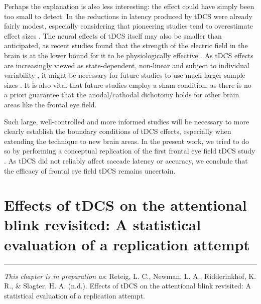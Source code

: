 \documentclass[11pt,english,]{memoir}
\begin{document}
Perhaps the explanation is also less interesting: the effect could have simply been too small to detect. In \textcite{Kanai2012} the reductions in latency produced by tDCS were already fairly modest, especially considering that pioneering studies tend to overestimate effect sizes \autocite{Ioannidis2008}. The neural effects of tDCS itself may also be smaller than anticipated, as recent studies found that the strength of the electric field in the brain is at the lower bound for it to be physiologically effective \autocites{Huang2017}{Voroslakos2018}. As tDCS effects are increasingly viewed as state-dependent, non-linear \autocites{Fertonani2017}{Bestmann2014} and subject to individual variability \autocites{Li2015b}{Krause2014}, it might be necessary for future studies to use much larger sample sizes \autocite{Minarik2016}. It is also vital that future studies employ a sham condition, as there is no a priori guarantee that the anodal/cathodal dichotomy holds for other brain areas \autocite{Bestmann2017} like the frontal eye field.

Such large, well-controlled and more informed \autocite{Polania2018} studies will be necessary to more clearly establish the boundary conditions of tDCS effects, especially when extending the technique to new brain areas. In the present work, we tried to do so by performing a conceptual replication of the first frontal eye field tDCS study \autocite{Kanai2012}. As tDCS did not reliably affect saccade latency or accuracy, we conclude that the efficacy of frontal eye field tDCS remains uncertain.

\hypertarget{AB-tDCS-EEG}{%
\chapter{Effects of tDCS on the attentional blink revisited: A statistical evaluation of a replication attempt}\label{AB-tDCS-EEG}}


\vspace*{\fill}

\begin{center}\rule{0.5\linewidth}{\linethickness}\end{center}

\small

\noindent
\emph{This chapter is in preparation as}: Reteig, L. C., Newman, L. A., Ridderinkhof, K. R., \& Slagter, H. A. (n.d.). Effects of tDCS on the attentional blink revisited: A statistical evaluation of a replication attempt.
\newpage
\normalsize
\end{document}
